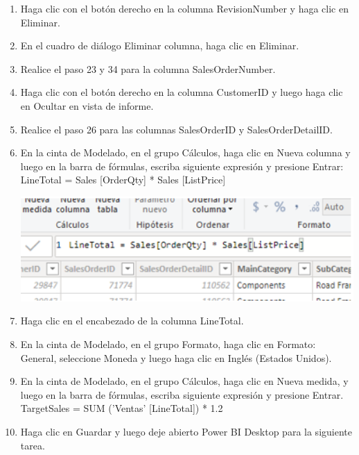 \begin{enumerate}
    \item Haga clic con el botón derecho en la columna RevisionNumber y haga clic en Eliminar.
     
    \item En el cuadro de diálogo Eliminar columna, haga clic en Eliminar.
    
    \item Realice el paso 23 y 34 para la columna SalesOrderNumber.
    
    \item Haga clic con el botón derecho en la columna CustomerID y luego haga clic en Ocultar en vista de informe.
    
    
    \item Realice el paso 26 para las columnas SalesOrderID y SalesOrderDetailID.
    
    
    \item En la cinta de Modelado, en el grupo Cálculos, haga clic en Nueva columna y luego en la barra de fórmulas, escriba
siguiente expresión y presione Entrar:
LineTotal = Sales [OrderQty] * Sales [ListPrice]

    \begin{center}
	\includegraphics[width=13cm]{./Imagenes/5}
	\end{center}

    \item Haga clic en el encabezado de la columna LineTotal.
    
     
    \item En la cinta de Modelado, en el grupo Formato, haga clic en Formato: General, seleccione Moneda y luego haga clic en Inglés (Estados Unidos).
 
    \item En la cinta de Modelado, en el grupo Cálculos, haga clic en Nueva medida, y luego en la barra de fórmulas, escriba
siguiente expresión y presione Entrar.
TargetSales = SUM ('Ventas' [LineTotal]) * 1.2
    \item Haga clic en Guardar y luego deje abierto Power BI Desktop para la siguiente tarea.
    

\end{enumerate}

